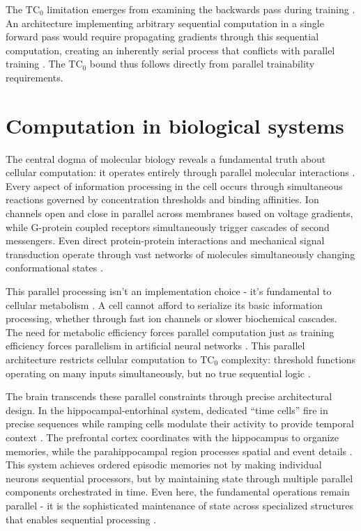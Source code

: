 \documentclass[12pt]{article}
\begin{document}
The $\text{TC}_0$ limitation emerges from examining the backwards pass during training \cite{jung2020new}. An architecture implementing arbitrary sequential computation in a single forward pass would require propagating gradients through this sequential computation, creating an inherently serial process that conflicts with parallel training \cite{zhu2024overcoming}. The $\text{TC}_0$ bound thus follows directly from parallel trainability requirements.

\section{Computation in biological systems}

The central dogma of molecular biology reveals a fundamental truth about cellular computation: it operates entirely through parallel molecular interactions \cite{wang2023parallel,cai2024efficient,fu2023scgrn}. Every aspect of information processing in the cell occurs through simultaneous reactions governed by concentration thresholds and binding affinities. Ion channels open and close in parallel across membranes based on voltage gradients, while G-protein coupled receptors simultaneously trigger cascades of second messengers. Even direct protein-protein interactions and mechanical signal transduction operate through vast networks of molecules simultaneously changing conformational states \cite{berridge2014cell}.

This parallel processing isn't an implementation choice - it's fundamental to cellular metabolism \cite{cai2024efficient,hoel2020emergence}. A cell cannot afford to serialize its basic information processing, whether through fast ion channels or slower biochemical cascades. The need for metabolic efficiency forces parallel computation just as training efficiency forces parallelism in artificial neural networks \cite{barrett2019analyzing}. This parallel architecture restricts cellular computation to $\text{TC}_0$ complexity: threshold functions operating on many inputs simultaneously, but no true sequential logic \cite{wang2023parallel}.

The brain transcends these parallel constraints through precise architectural design. In the hippocampal-entorhinal system, dedicated ``time cells'' fire in precise sequences while ramping cells modulate their activity to provide temporal context \cite{quentin2019differential}. The prefrontal cortex coordinates with the hippocampus to organize memories, while the parahippocampal region processes spatial and event details \cite{martini2015information}. This system achieves ordered episodic memories not by making individual neurons sequential processors, but by maintaining state through multiple parallel components orchestrated in time. Even here, the fundamental operations remain parallel - it is the sophisticated maintenance of state across specialized structures that enables sequential processing \cite{bruno2022epigenetic}.
\end{document}
